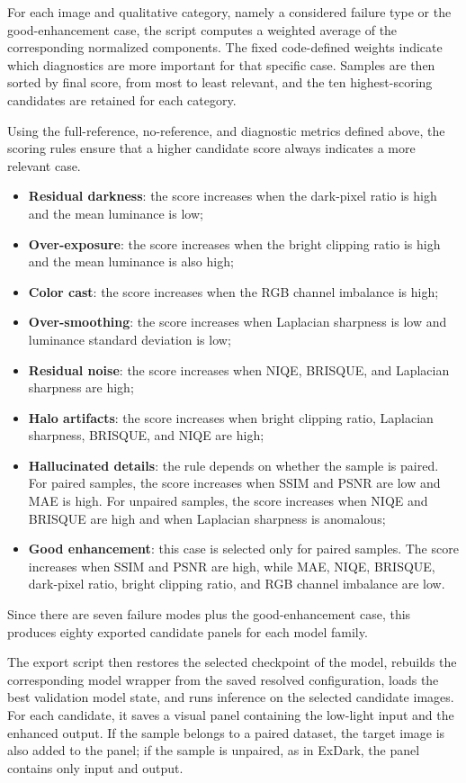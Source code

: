 For each image and qualitative category, namely a considered failure type or the good-enhancement case, the script computes a weighted average of the corresponding normalized components. The fixed code-defined weights indicate which diagnostics are more important for that specific case. Samples are then sorted by final score, from most to least relevant, and the ten highest-scoring candidates are retained for each category.

Using the full-reference, no-reference, and diagnostic metrics defined above, the scoring rules ensure that a higher candidate score always indicates a more relevant case.
\begin{itemize}[topsep=5pt]
	\item \textbf{Residual darkness}: the score increases when the dark-pixel ratio is high and the mean luminance is low;
	\item \textbf{Over-exposure}: the score increases when the bright clipping ratio is high and the mean luminance is also high;
	\item \textbf{Color cast}: the score increases when the RGB channel imbalance is high;
	\item \textbf{Over-smoothing}: the score increases when Laplacian sharpness is low and luminance standard deviation is low;
	\item \textbf{Residual noise}: the score increases when NIQE, BRISQUE, and Laplacian sharpness are high;
	\item \textbf{Halo artifacts}: the score increases when bright clipping ratio, Laplacian sharpness, BRISQUE, and NIQE are high;
	\item \textbf{Hallucinated details}: the rule depends on whether the sample is paired. For paired samples, the score increases when SSIM and PSNR are low and MAE is high. For unpaired samples, the score increases when NIQE and BRISQUE are high and when Laplacian sharpness is anomalous;
	\item \textbf{Good enhancement}: this case is selected only for paired samples. The score increases when SSIM and PSNR are high, while MAE, NIQE, BRISQUE, dark-pixel ratio, bright clipping ratio, and RGB channel imbalance are low.
\end{itemize}

Since there are seven failure modes plus the good-enhancement case, this produces eighty exported candidate panels for each model family.

The export script then restores the selected checkpoint of the model, rebuilds the corresponding model wrapper from the saved resolved configuration, loads the best validation model state, and runs inference on the selected candidate images. For each candidate, it saves a visual panel containing the low-light input and the enhanced output. If the sample belongs to a paired dataset, the target image is also added to the panel; if the sample is unpaired, as in ExDark, the panel contains only input and output.

